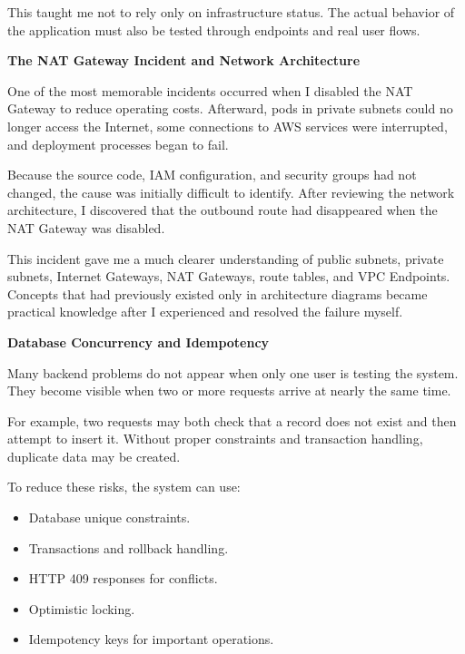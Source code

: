 This taught me not to rely only on infrastructure status. The actual
behavior of the application must also be tested through endpoints and
real user flows.

\vspace{0.5em}\noindent\textbf{The NAT Gateway Incident and Network
Architecture}\par

One of the most memorable incidents occurred when I disabled the NAT
Gateway to reduce operating costs. Afterward, pods in private subnets
could no longer access the Internet, some connections to AWS services
were interrupted, and deployment processes began to fail.

Because the source code, IAM configuration, and security groups had not
changed, the cause was initially difficult to identify. After reviewing
the network architecture, I discovered that the outbound route had
disappeared when the NAT Gateway was disabled.

This incident gave me a much clearer understanding of public subnets,
private subnets, Internet Gateways, NAT Gateways, route tables, and VPC
Endpoints. Concepts that had previously existed only in architecture
diagrams became practical knowledge after I experienced and resolved the
failure myself.

\vspace{0.5em}\noindent\textbf{Database Concurrency and
Idempotency}\par

Many backend problems do not appear when only one user is testing the
system. They become visible when two or more requests arrive at nearly
the same time.

For example, two requests may both check that a record does not exist
and then attempt to insert it. Without proper constraints and
transaction handling, duplicate data may be created.

To reduce these risks, the system can use:

\begin{itemize}
\tightlist
\item
  Database unique constraints.
\item
  Transactions and rollback handling.
\item
  HTTP 409 responses for conflicts.
\item
  Optimistic locking.
\item
  Idempotency keys for important operations.
\end{itemize}

